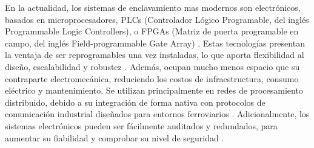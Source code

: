     En la actualidad, los sistemas de enclavamiento mas modernos son electrónicos, basados en microprocesadores, PLCs (Controlador Lógico Programable, del inglés Programmable Logic Controllers), o FPGAs (Matriz de puerta programable en campo, del inglés Field-programmable Gate Array) \cite{Paper_3,Paper_8,Paper_16,Paper_18,Paper_22,Paper_24,Paper_25,Paper_28,Paper_31,Paper_34,Paper_35,Paper_36,Paper_119,Paper_137}. Estas tecnologías presentan la ventaja de ser reprogramables una vez instaladas, lo que aporta flexibilidad al diseño, escalabilidad y robustez \cite{Paper_38,Paper_46,Paper_47,Paper_105,Paper_118,Paper_124,Paper_128,Paper_130,Paper_131,Paper_133,Paper_135,Paper_204}. Además, ocupan mucho menos espacio que su contraparte electromecánica, reduciendo los costos de infraestructura, consumo eléctrico y mantenimiento. Se utilizan principalmente en redes de procesamiento distribuido, debido a su integración de forma nativa con protocolos de comunicación industrial diseñados para entornos ferroviarios \cite{Paper_125,Paper_37,Paper_41}. Adicionalmente, los sistemas electrónicos pueden ser fácilmente auditados y redundados, para aumentar su fiabilidad y comprobar su nivel de seguridad \cite{Paper_23,Paper_29,Paper_43,Paper_49,Paper_97,Paper_98,Paper_132,Paper_140}.